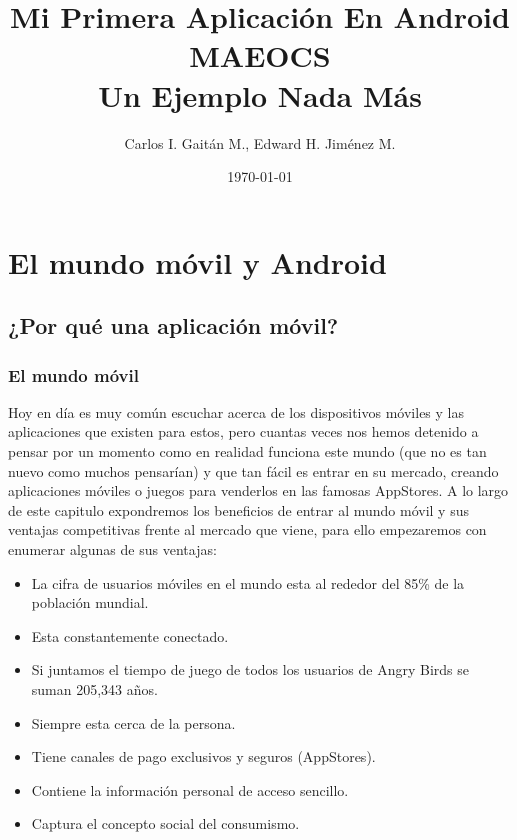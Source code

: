 \documentclass[11pt]{book}
\title{\bf Mi Primera Aplicación En Android\\ MAEOCS\\ Un Ejemplo Nada Más}    %
\author{Carlos I. Gaitán M., Edward H. Jiménez M.}              %
\date{\today}                           %
\begin{document}
                        
\frontmatter                            %
\maketitle                              %
\tableofcontents                        %
\mainmatter                             %




\part{El mundo móvil y Android}  
    
\chapter{¿Por qué una aplicación móvil?}

\newpage
\section{El mundo móvil}              	
Hoy en día es muy común escuchar acerca de los dispositivos móviles y las aplicaciones que existen para estos, pero cuantas veces nos hemos detenido a pensar por un momento como en realidad funciona este mundo (que no es tan nuevo como muchos pensarían) y que tan fácil es entrar en su mercado, creando aplicaciones móviles o juegos para venderlos en las famosas \gls{AppStores}. A lo largo de este capitulo expondremos los beneficios de entrar al mundo móvil y sus ventajas competitivas frente al mercado que viene, para ello empezaremos con enumerar algunas de sus ventajas:

\begin{itemize}
\item La cifra de usuarios móviles en el mundo esta al rededor del 85\% de la población mundial.
\item Esta constantemente conectado.
\item Si juntamos el tiempo de juego de todos los usuarios de \gls{Angry Birds} se suman 205,343 años.
\item Siempre esta cerca de la persona.
\item Tiene canales de pago exclusivos y seguros (\gls{AppStores}).
\item Contiene la información personal de acceso sencillo.
\item Captura el concepto social del consumismo.
\end{itemize}
\end{document}
